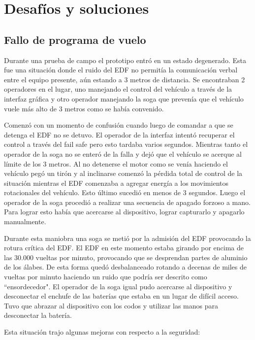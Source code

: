 \section{Desafíos y soluciones}\label{sec:challenges-solutions}

\subsection{Fallo de programa de vuelo}
Durante una prueba de campo el prototipo entró en un estado degenerado. Esta fue una situación donde el ruido del EDF no permitía la comunicación verbal entre el equipo presente, aún estando a 3 metros de distancia. Se encontraban 2 operadores en el lugar, uno manejando el control del vehículo a través de la interfaz gráfica y otro operador manejando la soga que prevenía que el vehículo vuele más alto de 3 metros como se había convenido.

Comenzó con un momento de confusión cuando luego de comandar a que se detenga el EDF no se detuvo. El operador de la interfaz intentó recuperar el control a través del fail safe pero esto tardaba varios segundos. Mientras tanto el operador de la soga no se enteró de la falla y dejó que el vehículo se acerque al límite de los 3 metros. Al no detenerse el motor como se venía haciendo el vehículo pegó un tirón y al inclinarse comenzó la pérdida total de control de la situación mientras el EDF comenzaba a agregar energía a los movimientos rotacionales del vehículo. Esto último sucedió en menos de 3 segundos. Luego el operador de la soga procedió a realizar una secuencia de apagado forzoso a mano. Para lograr esto había que acercarse al dispositivo, lograr capturarlo y apagarlo manualmente.

Durante esta maniobra una soga se metió por la admisión del EDF provocando la rotura crítica del EDF. El EDF en este momento estaba girando por encima de las 30.000 vueltas por minuto, provocando que se desprendan partes de aluminio de los álabes. De esta forma quedó desbalanceado rotando a decenas de miles de vueltas por minuto haciendo un ruido que podría ser descrito como ``ensordecedor". El operador de la soga igual pudo acercarse al dispositivo y desconectar el enchufe de las baterías que estaba en un lugar de difícil acceso. Tuvo que abrazar al dispositivo con los codos y utilizar las manos para desconectar la batería.

Esta situación trajo algunas mejoras con respecto a la seguridad:

